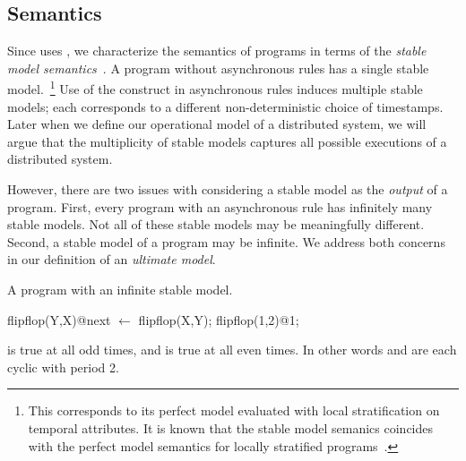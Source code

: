 \subsection{Semantics}
Since \lang uses , we characterize the semantics of \lang programs in terms of the {\em stable model semantics}~\cite{stable-model}.  A \lang program without asynchronous rules has a single stable model.~\footnote{This corresponds to its perfect model evaluated with local stratification on temporal attributes.  It is known that the stable model semanics coincides with the perfect model semantics for locally stratified programs~\cite{stable-model}.}  Use of the  construct in asynchronous rules induces multiple stable models; each corresponds to a different non-deterministic choice of timestamps.  Later when we define our operational model of a distributed system, we will argue that the multiplicity of stable models captures all possible executions of a distributed system.

However, there are two issues with considering a stable model as the {\em output} of a \lang program.  First, every program with an asynchronous rule has infinitely many stable models.  Not all of these stable models may be meaningfully different.  Second, a stable model of a \lang program may be infinite.  We address both concerns in our definition of an {\em ultimate model}.

\begin{example}
\label{ex:flipflop}
A \lang program with an infinite stable model.

\begin{Dedalus}
flipflop(Y,X)@next \(\leftarrow\) flipflop(X,Y);
flipflop(1,2)@1;
\end{Dedalus}

 is true at all odd times, and  is true at all even times.  In other words  and  are each cyclic with period 2.
\end{example}



